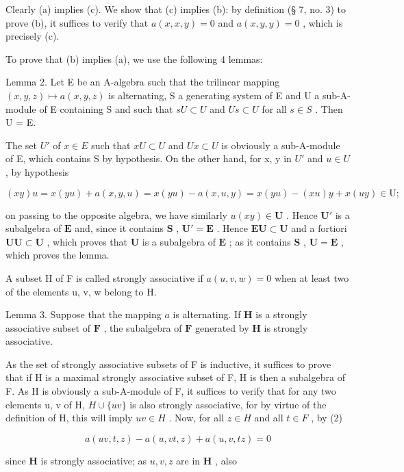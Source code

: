 Clearly (a) implies (c). We show that (c) implies (b): by definition (§ 7, no. 3) to prove (b), it suffices to verify that \(a(x, x, y) = 0\) and \(a(x, y, y) = 0\) , which is precisely (c).

To prove that (b) implies (a), we use the following 4 lemmas:

Lemma 2. Let E be an A-algebra such that the trilinear mapping \((x,y,z)\mapsto a(x,y,z)\) is alternating, S a generating system of E and U a sub-A-module of E containing S and such that \(sU\subset U\) and \(Us\subset U\) for all \(s\in S\) . Then U = E.

The set \(U'\) of \(x \in E\) such that \(xU \subset U\) and \(Ux \subset U\) is obviously a sub-A-module of E, which contains S by hypothesis. On the other hand, for x, y in \(U'\) and \(u \in U\) , by hypothesis

\[
(x y) u = x (y u) + a (x, y, u) = x (y u) - a (x, u, y) = x (y u) - (x u) y + x (u y) \in \mathrm{U};
\]

on passing to the opposite algebra, we have similarly \(u(xy) \in \mathbf{U}\) . Hence \(\mathbf{U}'\) is a subalgebra of \(\mathbf{E}\) and, since it contains \(\mathbf{S}\) , \(\mathbf{U}' = \mathbf{E}\) . Hence \(\mathbf{EU} \subset \mathbf{U}\) and a fortiori \(\mathbf{UU} \subset \mathbf{U}\) , which proves that \(\mathbf{U}\) is a subalgebra of \(\mathbf{E}\) ; as it contains \(\mathbf{S}\) , \(\mathbf{U} = \mathbf{E}\) , which proves the lemma.

A subset H of F is called strongly associative if \(a(u, v, w) = 0\) when at least two of the elements u, v, w belong to H.

Lemma 3. Suppose that the mapping \(a\) is alternating. If \(\mathbf{H}\) is a strongly associative subset of \(\mathbf{F}\) , the subalgebra of \(\mathbf{F}\) generated by \(\mathbf{H}\) is strongly associative.

As the set of strongly associative subsets of F is inductive, it suffices to prove that if H is a maximal strongly associative subset of F, H is then a subalgebra of F. As H is obviously a sub-A-module of F, it suffices to verify that for any two elements u, v of H, \(H \cup \{uv\}\) is also strongly associative, for by virtue of the definition of H, this will imply \(uv \in H\) . Now, for all \(z \in H\) and all \(t \in F\) , by (2)

\[
a (u v, t, z) - a (u, v t, z) + a (u, v, t z) = 0
\]

since \(\mathbf{H}\) is strongly associative; as \(u, v, z\) are in \(\mathbf{H}\) , also

